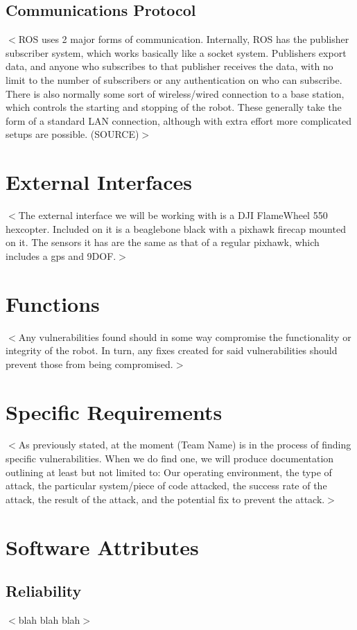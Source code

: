 \documentclass{scrreprt}
\begin{document}
\subsection{Communications Protocol}
$<$ROS uses 2 major forms of communication. Internally, ROS has the publisher subscriber system, which works basically like a socket system.
Publishers export data, and anyone who subscribes to that publisher receives the data, with no limit to the number of
subscribers or any authentication on who can subscribe. There is also normally some sort of wireless/wired connection to a base
station, which controls the starting and stopping of the robot. These generally take the form of a standard LAN connection,
although with extra effort more complicated setups are possible. (SOURCE)$>$

\section{External Interfaces}
$<$The external interface we will be working with is a DJI FlameWheel 550 hexcopter. 
Included on it is a beaglebone black with a pixhawk firecap mounted on it. 
The sensors it has are the same as that of a regular pixhawk, which includes a gps and 9DOF.$>$

\section{Functions}
$<$Any vulnerabilities found should in some way compromise the functionality or integrity of the robot. In turn, any fixes created for said vulnerabilities should prevent those from being compromised.$>$

\section{Specific Requirements}
$<$As previously stated, at the moment (Team Name) is in the process of finding specific vulnerabilities. When we do find one, we will produce documentation outlining at least but not limited to:
Our operating environment, the type of attack, the particular system/piece of code attacked, the success rate of the attack, the result of the attack, and the potential fix to prevent the attack.$>$

\section{Software Attributes}
  \subsection{Reliability}
  $<$blah blah blah$>$
\end{document}
